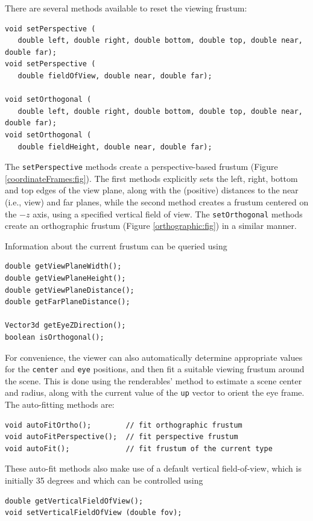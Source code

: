 There are several methods available to reset the viewing frustum:
%
\begin{lstlisting}[]
void setPerspective (
   double left, double right, double bottom, double top, double near, double far);
void setPerspective (
   double fieldOfView, double near, double far);

void setOrthogonal (
   double left, double right, double bottom, double top, double near, double far);
void setOrthogonal (
   double fieldHeight, double near, double far);
\end{lstlisting}
%
The {\tt setPerspective} methods create a perspective-based frustum
(Figure \ref{coordinateFrames:fig}). The first methods explicitly sets
the left, right, bottom and top edges of the view plane, along with
the (positive) distances to the near (i.e., view) and far planes,
while the second method creates a frustum centered on the $-z$ axis,
using a specified vertical field of view. The {\tt setOrthogonal}
methods create an orthographic frustum (Figure \ref{orthographic:fig})
in a similar manner.

Information about the current frustum can be queried using
%
\begin{lstlisting}[]
double getViewPlaneWidth();
double getViewPlaneHeight();
double getViewPlaneDistance();
double getFarPlaneDistance();

Vector3d getEyeZDirection();
boolean isOrthogonal();
\end{lstlisting}
%

For convenience, the viewer can also automatically determine
appropriate values for the {\tt center} and {\tt eye} positions, and
then fit a suitable viewing frustum around the scene. This is done
using the renderables'
 method to
estimate a scene center and radius, along with the current value of
the {\tt up} vector to orient the eye frame. The auto-fitting
methods are:
%
\begin{lstlisting}[]
void autoFitOrtho();        // fit orthographic frustum
void autoFitPerspective();  // fit perspective frustum
void autoFit();             // fit frustum of the current type
\end{lstlisting}
%
These auto-fit methods also make use of a default vertical
field-of-view, which is initially 35 degrees and which
can be controlled using
%
\begin{lstlisting}[]
double getVerticalFieldOfView();
void setVerticalFieldOfView (double fov);
\end{lstlisting}
%

